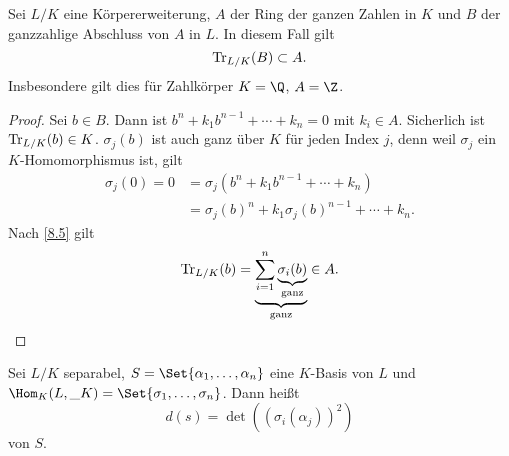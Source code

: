 \begin{kor} \label{8.6}
	Sei $L / K$ eine Körpererweiterung, $A$ der Ring der ganzen Zahlen in $K$ und $B$ der ganzzahlige Abschluss von $A$ in $L$.
	In diesem Fall gilt
	\[
		\operatorname{Tr}_{L/K}(B) \subset A.
	\]
	Insbesondere gilt dies für Zahlkörper $K = \Q$, $A = \Z$.
	\begin{proof}
		Sei $b \in B$. Dann ist $b^n + k_1 b^{n-1} + \dotsb + k_n = 0$ mit $k_i \in A$.
		Sicherlich ist $\operatorname{Tr}_{L/K}(b) \in K$.
		$\sigma_j(b)$ ist auch ganz über $K$ für jeden Index $j$, denn weil $\sigma_j$ ein $K$-Homomorphismus ist, gilt
		\begin{align*}
			\sigma_j(0)
			= 0
			&= \sigma_j(b^n + k_1b^{n-1} + \dotsb + k_n) \\
			&= \sigma_j(b)^n + k_1 \sigma_j(b)^{n-1} + \dotsb + k_n.
		\end{align*}
		Nach \ref{8.5} gilt
		\[
			\operatorname{Tr}_{L/K}(b)
			= \underbrace{\sum_{i=1}^n \underbrace{\sigma_i(b)}_{\text{ganz}}}_{\text{ganz}}
			\in A.
		\]
	\end{proof}
\end{kor}

\begin{df} \label{8.7}
	Sei $L/K$ separabel, $S = \Set{\alpha_1, \dotsc, \alpha_n}$ eine $K$-Basis von $L$ und $\Hom_{K}(L, \_K) = \Set{ \sigma_1, \dotsc, \sigma_n}$.
	Dann heißt
	\[
		d(s) = \det((\sigma_i(\alpha_j))^2)
	\]
	 von $S$.
\end{df}


